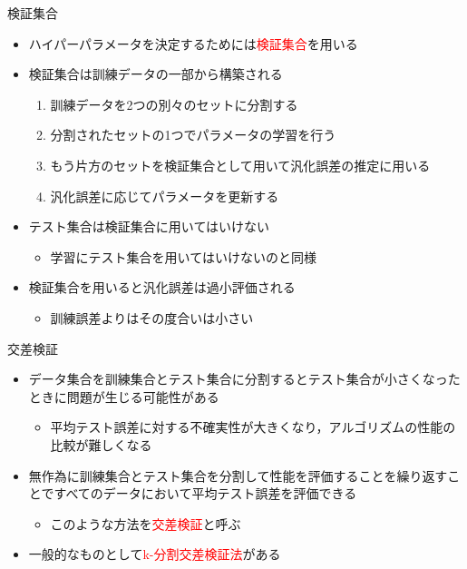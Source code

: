 \documentclass[dvipdfmx, 10pt]{beamer}
\newcommand{\green}[1]{\textcolor{green!40!black}{#1}}
\begin{document}
\begin{frame}{検証集合}
  \begin{itemize}
    \item ハイパーパラメータを決定するためには\textcolor{red}{検証集合}を用いる
    \item 検証集合は訓練データの一部から構築される
    \begin{enumerate}
      \item 訓練データを2つの別々のセットに分割する
      \item 分割されたセットの1つでパラメータの学習を行う
      \item もう片方のセットを検証集合として用いて汎化誤差の推定に用いる
      \item 汎化誤差に応じてパラメータを更新する
    \end{enumerate}
    \item テスト集合は検証集合に用いてはいけない
    \begin{itemize}
      \item 学習にテスト集合を用いてはいけないのと同様
    \end{itemize}
    \item 検証集合を用いると汎化誤差は過小評価される
    \begin{itemize}
      \item 訓練誤差よりはその度合いは小さい
    \end{itemize}
  \end{itemize}
\end{frame}


\begin{frame}{交差検証}
  \begin{itemize}
    \item データ集合を訓練集合とテスト集合に分割するとテスト集合が小さくなったときに問題が生じる可能性がある
    \begin{itemize}
      \item 平均テスト誤差に対する不確実性が大きくなり，アルゴリズムの性能の比較が難しくなる
    \end{itemize}
    \item 無作為に訓練集合とテスト集合を分割して性能を評価することを繰り返すことですべてのデータにおいて平均テスト誤差を評価できる
    \begin{itemize}
      \item このような方法を\textcolor{red}{交差検証}と呼ぶ
    \end{itemize}
  \item 一般的なものとして\textcolor{red}{k-分割交差検証法}がある
  \end{itemize}
\end{frame}
\end{document}
